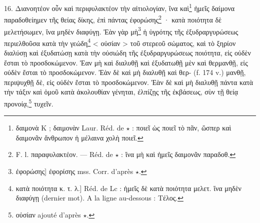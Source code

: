 \documentclass[landscape, a4paper, 11pt, oneside, polutonikogreek, french]{article}
\begin{document}
16. Διανοητέον οὖν καὶ περιφυλακτέον τὴν αἰτιολογίαν, ἵνα καὶ\footnote{δαιμονὰ K ; δαιμονὰν Laur. Réd. de $\star$ : ποιεῖ ὡς ποιεῖ τὸ πᾶν, ὥσπερ καὶ δαιμονᾶν ἄνθρωπον ἡ μέλαινα χολὴ ποιεῖ.} ἡμεῖς δαίμονα παραδοθείημεν τῆς θείας δίκης, ἐπὶ πάντας ἐφορώσης\footnote{F. l. παραφυλακτέον. --- Réd. de $\star$ : ἵνα μὴ καὶ ἡμεῖς δαιμονᾶν παραδοθ.} · κατὰ ποιότητα δὲ μελετήσωμεν, ἵνα μηδὲν διαφύγῃ. Ἐὰν γὰρ μὴ\footnote{ἐφορώσης] ἐφορίσης mss. Corr. d'après $\star$.} ἡ ὑγρότης τῆς ἐξυδραργυρώσεως περιελθοῦσα κατὰ τὴν γεώδη\footnote{κατὰ ποιότητα κ. τ. λ.] Réd. de Lc : ἡμεῖς δὲ κατὰ ποιότητα μελετ. ἵνα μηδὲν διαφύγῃ (dernier mot). A la ligne au-dessous : Tέλος.} < οὐσίαν > τοῦ στερεοῦ σώματος, καὶ τὸ ξηρίον διαλύσῃ καὶ ἐξυδατώσῃ κατὰ τὴν οὐσιώδη τῆς ἐξυδραργυρώσεως ποιότητα, εἰς οὐδὲν ἔσται τὸ προσδοκώμενον. Ἐαν μὴ καὶ διαλυθῇ καὶ ἐξυδατωθῇ μὲν καὶ θερμανθῇ, εἰς οὐδὲν ἔσται τὸ προσδοκώμενον. Ἐὰν δὲ καὶ μὴ διαλυθῇ καὶ θερ- (f. 174 v.) μανθῇ, περιψυχθῇ δὲ, εἰς οὐδὲν ἔσται τὸ προσδοκώμενον. Ἐὰν δὲ καὶ μὴ διαλυθῇ πάντα κατὰ τὴν τάξιν καὶ ὁμοῦ κατὰ ἀκολουθίαν γένηται, ἐλπίζῃς τῆς ἐκβάσεως, σὺν τῇ θείᾳ προνοίᾳ,\footnote{οὐσίαν ajouté d'après $\star$.} τυχεῖν.
\end{document}
